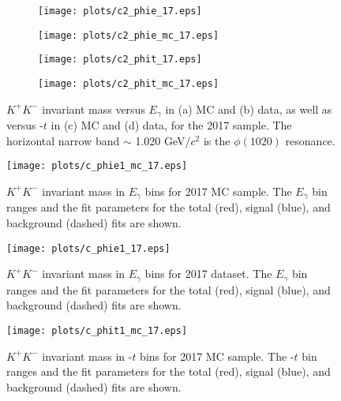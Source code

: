 \begin{center}
\null
\vfill
\begin{figure}[htbp]
    \centering
    \begin{subfigure}[b]{0.5\textwidth}
        \texttt{[image: plots/c2\_phie\_17.eps]}
        \caption{}
        \label{fig.xsec_ul.phi2pi.2.a}
    \end{subfigure}\hfill
    \begin{subfigure}[b]{0.5\textwidth}
        \texttt{[image: plots/c2\_phie\_mc\_17.eps]}
        \caption{}
        \label{fig.xsec_ul.phi2pi.2.b}
    \end{subfigure}
    \begin{subfigure}[b]{0.5\textwidth}
        \texttt{[image: plots/c2\_phit\_17.eps]}
        \caption{}
        \label{fig.xsec_ul.phi2pi.2.c}
    \end{subfigure}\hfill
    \begin{subfigure}[b]{0.5\textwidth}
        \texttt{[image: plots/c2\_phit\_mc\_17.eps]}
        \caption{}
        \label{fig.xsec_ul.phi2pi.2.d}
    \end{subfigure}
    \caption{\label{fig.xsec_ul.phi2pi.2}$K^{+}K^{-}$ invariant mass versus $E_{\gamma}$ in (a) MC and (b) data, as well as versus -$t$ in (c) MC and (d) data, for the 2017 sample. The horizontal narrow band $\sim$ 1.020 GeV/$c^2$ is the $\phi(1020)$ resonance.}
\end{figure}
\null
\vfill
\end{center}

\begin{figure}[H]
    \centering
    \texttt{[image: plots/c\_phie1\_mc\_17.eps]}
    \caption{\label{fig.xsec_ul.phi2pi.3}$K^{+}K^{-}$ invariant mass in $E_{\gamma}$ bins for 2017 MC sample. The $E_{\gamma}$ bin ranges and the fit parameters for the total (red), signal (blue), and background (dashed) fits are shown.}
\end{figure}

\begin{figure}[H]
    \centering
    \texttt{[image: plots/c\_phie1\_17.eps]}
    \caption{\label{fig.xsec_ul.phi2pi.4}$K^{+}K^{-}$ invariant mass in $E_{\gamma}$ bins for 2017 dataset. The $E_{\gamma}$ bin ranges and the fit parameters for the total (red), signal (blue), and background (dashed) fits are shown.}
\end{figure}

\begin{figure}[H]
    \centering
    \texttt{[image: plots/c\_phit1\_mc\_17.eps]}
    \caption{\label{fig.xsec_ul.phi2pi.5}$K^{+}K^{-}$ invariant mass in -$t$ bins for 2017 MC sample. The -$t$ bin ranges and the fit parameters for the total (red), signal (blue), and background (dashed) fits are shown.}
\end{figure}

